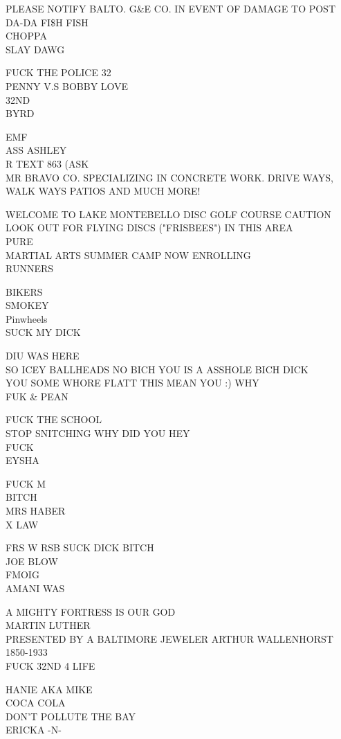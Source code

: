 \documentclass[10pt,letterpaper]{article}
\begin{document}
PLEASE NOTIFY BALTO. G\&E CO. IN EVENT OF DAMAGE TO POST\\
DA{-}DA FI\$H FISH\\
CHOPPA\\
SLAY DAWG

FUCK THE POLICE 32\\
PENNY V.S BOBBY LOVE\\
32ND\\
BYRD

EMF\\
ASS ASHLEY\\
R TEXT 863 (ASK\\
MR BRAVO CO. SPECIALIZING IN CONCRETE WORK.  DRIVE WAYS, WALK WAYS PATIOS AND MUCH MORE!

WELCOME TO LAKE MONTEBELLO DISC GOLF COURSE CAUTION LOOK OUT FOR FLYING DISCS ("FRISBEES") IN THIS AREA\\
PURE\\
MARTIAL ARTS SUMMER CAMP NOW ENROLLING\\
RUNNERS

BIKERS\\
SMOKEY\\
Pinwheels\\
SUCK MY DICK

DIU WAS HERE\\
SO ICEY BALLHEADS NO BICH YOU IS A ASSHOLE BICH DICK\\
YOU SOME WHORE FLATT THIS MEAN YOU :) WHY\\
FUK \& PEAN

FUCK THE SCHOOL\\
STOP SNITCHING WHY DID YOU HEY\\
FUCK\\
EYSHA

FUCK M\\
BITCH\\
MRS HABER\\
X LAW

FRS W RSB SUCK DICK BITCH\\
JOE BLOW\\
FMOIG\\
AMANI WAS

A MIGHTY FORTRESS IS OUR GOD\\
MARTIN LUTHER\\
PRESENTED BY A BALTIMORE JEWELER ARTHUR WALLENHORST 1850{-}1933\\
FUCK 32ND 4 LIFE

HANIE AKA MIKE\\
COCA COLA\\
DON'T POLLUTE THE BAY\\
ERICKA {-}N{-}
\end{document}

